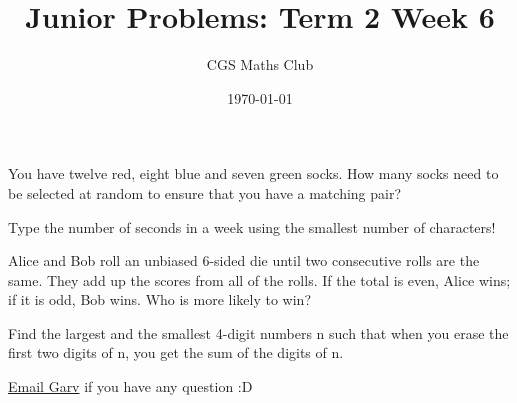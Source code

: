 \documentclass[11pt]{article}
\title{Junior Problems: Term 2 Week 6}
\author{CGS Maths Club}
\date{\today}
\newenvironment{problem}[2][Problem]{\begin{trivlist}
\item[\hskip \labelsep {\bfseries #1}\hskip \labelsep {\bfseries #2.}]}{\end{trivlist}}
\begin{document}
\maketitle

\begin{problem}{1}
You have twelve red, eight blue and seven green socks. How many socks need to be selected at random to ensure that you have a matching pair?
\end{problem}

\begin{problem}{2}
	Type the number of seconds in a week using the smallest number of characters!
\end{problem}

\begin{problem}{3}
	Alice and Bob roll an unbiased 6-sided die until two consecutive rolls are the same. They add up the scores from all of the rolls. If the total is even, Alice wins; if it is odd, Bob wins. Who is more likely to win?
\end{problem}

\begin{problem}{4}
	Find the largest and the smallest 4-digit numbers n such that when you erase the first two digits of n, you get the sum of the digits of n.
\end{problem}

\href{mailto:GarvShah@caulfieldgs.vic.edu.au}{Email Garv} if you have any question :D
\end{document}
